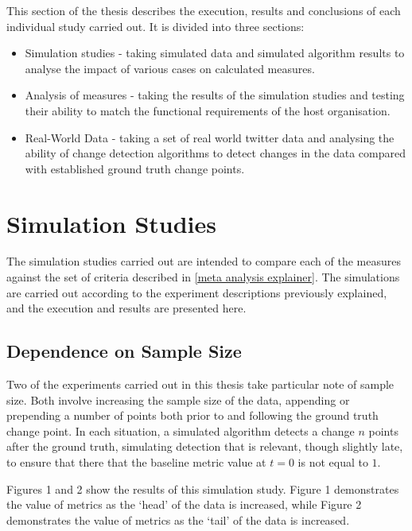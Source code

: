 \documentclass{uvamscse}	%
\begin{document}
This section of the thesis describes the execution, results and conclusions of each individual study carried out. It is divided into three sections:

\begin{itemize}
    \item Simulation studies - taking simulated data and simulated algorithm results to analyse the impact of various cases on calculated measures.
    \item Analysis of measures - taking the results of the simulation studies and testing their ability to match the functional requirements of the host organisation.
    \item Real-World Data - taking a set of real world twitter data and analysing the ability of change detection algorithms to detect changes in the data compared with established ground truth change points.
\end{itemize}

\section{Simulation Studies}

The simulation studies carried out are intended to compare each of the measures against the set of criteria described in \autoref{meta analysis explainer}. The simulations are carried out according to the experiment descriptions previously explained, and the execution and results are presented here.

\subsection{Dependence on Sample Size}
\label{sample size dependence}

Two of the experiments carried out in this thesis take particular note of sample size. Both involve increasing the sample size of the data, appending or prepending a number of points both prior to and following the ground truth change point. In each situation, a simulated algorithm detects a change $n$ points after the ground truth, simulating detection that is relevant, though slightly late, to ensure that there that the baseline metric value at $t = 0$ is not equal to $1$.


Figures 1 and 2 show the results of this simulation study. Figure 1 demonstrates the value of metrics as the `head' of the data is increased, while Figure 2 demonstrates the value of metrics as the `tail' of the data is increased.
\end{document}
